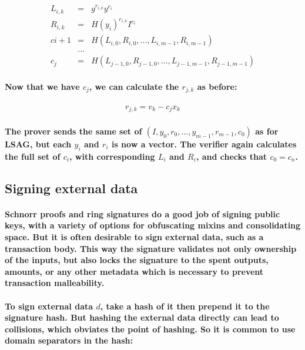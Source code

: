 \documentclass{article}
\begin{document}
\begin{eqnarray}
  L_{i,k} &=& g^{r_{i,k}} y^{c_i}\\
  R_{i,k} &=& H(y_i)^{r_{i,k}} I^{c_i}\\
  ci+1 &=& H(L_{i,0}, R_{i,0}, ..., L_{i,m-1}, R_{i,m-1}) \\
  &...& \\
  c_j &=& H(L_{j-1,0}, R_{j-1,0}, ..., L_{j-1,m-1}, R_{j-1,m-1}) 
\end{eqnarray}

\paragraph{Now that we have $c_j$, we can calculate the $r_{j,k}$ as before:}

\begin{eqnarray}
  r_{j,k} = v_k - c_j x_k
\end{eqnarray}

\paragraph{The prover sends the same set of $(I, y_0, r_0, ..., y_{m-1}, r_{m-1}, c_0)$ as for LSAG, but each $y_i$ and $r_i$ is now a vector.  The verifier again calculates the full set of $c_i$, with corresponding $L_i$ and $R_i$, and checks that $c_0 = c_n$.}


\subsection{Signing external data}

\paragraph{Schnorr proofs and ring signatures do a good job of signing public keys, with a variety of options for obfuscating mixins and consolidating space.  But it is often desirable to sign external data, such as a transaction body.  This way the signature validates not only ownership of the inputs, but also locks the signature to the spent outputs, amounts, or any other metadata which is necessary to prevent transaction malleability.}

\paragraph{To sign external data $d$, take a hash of it then prepend it to the signature hash.  But hashing the external data directly can lead to collisions, which obviates the point of hashing.  So it is common to use domain separators in the hash:}
\end{document}
